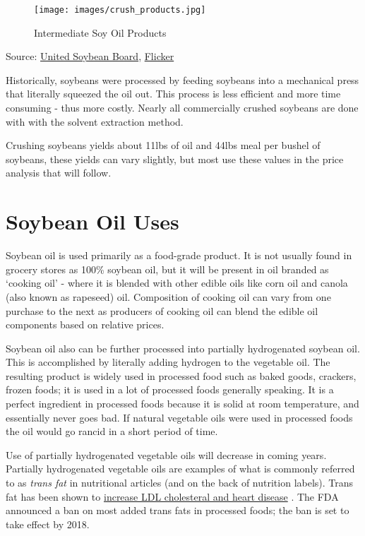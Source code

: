 \documentclass[
]{book}
\begin{document}
\begin{figure}
\centering
\texttt{[image: images/crush\_products.jpg]}
\caption{Intermediate Soy Oil Products}
\end{figure}

Source: \href{http://unitedsoybean.org/}{United Soybean Board}, \href{https://www.flickr.com/photos/unitedsoybean/10058954054/}{Flicker}

Historically, soybeans were processed by feeding soybeans into a mechanical press that literally squeezed the oil out. This process is less efficient and more time consuming - thus more costly. Nearly all commercially crushed soybeans are done with with the solvent extraction method.

Crushing soybeans yields about 11lbs of oil and 44lbs meal per bushel of soybeans, these yields can vary slightly, but most use these values in the price analysis that will follow.

\hypertarget{soybean-oil-uses}{%
\section{Soybean Oil Uses}\label{soybean-oil-uses}}

Soybean oil is used primarily as a food-grade product. It is not usually found in grocery stores as 100\% soybean oil, but it will be present in oil branded as `cooking oil' - where it is blended with other edible oils like corn oil and canola (also known as rapeseed) oil. Composition of cooking oil can vary from one purchase to the next as producers of cooking oil can blend the edible oil components based on relative prices.

Soybean oil also can be further processed into partially hydrogenated soybean oil. This is accomplished by literally adding hydrogen to the vegetable oil. The resulting product is widely used in processed food such as baked goods, crackers, frozen foods; it is used in a lot of processed foods generally speaking. It is a perfect ingredient in processed foods because it is solid at room temperature, and essentially never goes bad. If natural vegetable oils were used in processed foods the oil would go rancid in a short period of time.

Use of partially hydrogenated vegetable oils will decrease in coming years. Partially hydrogenated vegetable oils are examples of what is commonly referred to as \emph{trans fat} in nutritional articles (and on the back of nutrition labels). Trans fat has been shown to \href{http://www.fda.gov/ForConsumers/ConsumerUpdates/ucm372915.htm}{increase LDL cholesteral and heart disease} \citep{remig_trans_2010}. The FDA announced a ban on most added trans fats in processed foods; the ban is set to take effect by 2018.
\end{document}
